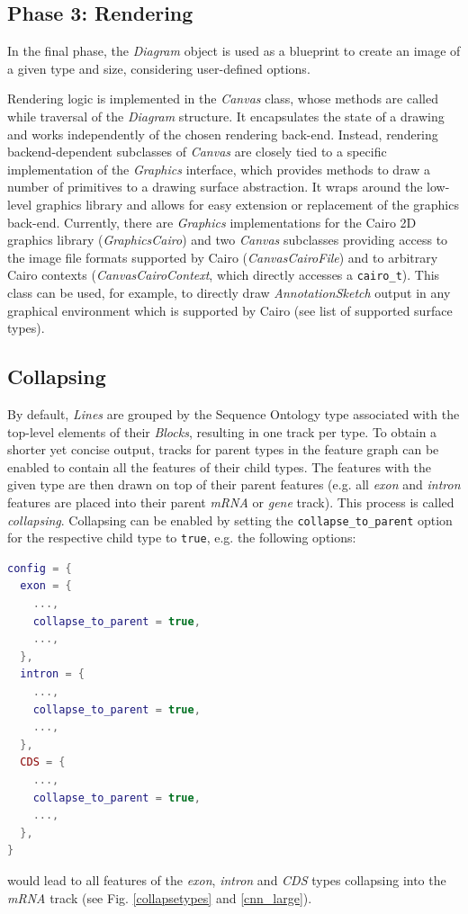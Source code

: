 \documentclass[a4paper]{scrreprt}
\begin{document}
\subsection{Phase 3: Rendering}
In the final phase, the \emph{Diagram} object is used as a blueprint to create an
image of a given type and size, considering user-defined options.

Rendering logic is implemented in the \emph{Canvas} class, whose methods are called while traversal of the \emph{Diagram} structure. It encapsulates the state of a drawing and works independently of the chosen rendering back-end. Instead, rendering backend-dependent subclasses of \emph{Canvas} are closely tied to a specific implementation of the \emph{Graphics} interface, which provides methods to draw a number of primitives to a
drawing surface abstraction. It wraps around the low-level graphics library and allows for easy extension or replacement of the graphics back-end. Currently, there are \emph{Graphics} implementations for the Cairo 2D graphics library (\emph{GraphicsCairo}) and two \emph{Canvas} subclasses providing access to the image file formats supported by Cairo (\emph{CanvasCairoFile}) and to arbitrary Cairo contexts (\emph{CanvasCairoContext}, which directly accesses a \texttt{cairo\_t}). This class can be used, for example, to directly draw \emph{AnnotationSketch} output in any graphical environment which is supported by Cairo (see  list of supported surface types).



\subsection{Collapsing}
By default, \emph{Lines} are grouped by the Sequence Ontology type associated with the top-level elements of their \emph{Blocks}, resulting in one track per type.
To obtain a shorter yet concise output, tracks for parent types in the feature graph can be enabled to contain all the features of their child types. The features with the given type are then drawn on top of their parent features (e.g. all \emph{exon} and \emph{intron} features are placed into their parent \emph{mRNA} or \emph{gene} track). This process is called \emph{collapsing}. Collapsing can be enabled by setting the \texttt{collapse\_to\_parent} option for the respective child type to \texttt{true}, e.g. the following options:

\begin{lstlisting}[language=Lua, showstringspaces=false,numbers=none,frame=single]
config = {
  exon = {
    ...,
    collapse_to_parent = true,
    ...,
  },
  intron = {
    ...,
    collapse_to_parent = true,
    ...,
  },
  CDS = {
    ...,
    collapse_to_parent = true,
    ...,
  },
}
\end{lstlisting}
would lead to all features of the \emph{exon}, \emph{intron} and \emph{CDS} types collapsing into the \emph{mRNA} track (see Fig. \ref{collapsetypes} and \ref{cnn_large}).
\end{document}
